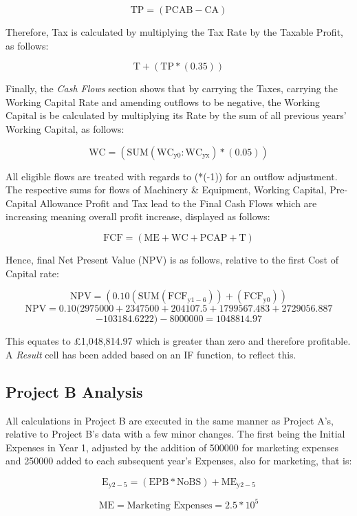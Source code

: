 \documentclass[11pt, english]{article}
\begin{document}
	$$\mathrm{TP=(PCAB-CA)}$$

	Therefore, Tax is calculated by multiplying the Tax Rate by the Taxable Profit, as follows:

	$$\mathrm{T+(TP*(0.35))}$$

	Finally, the \textit{Cash Flows} section shows that by carrying the Taxes, carrying the Working Capital Rate and amending outflows to be negative, the Working Capital is be calculated by multiplying its Rate by the sum of all previous years’ Working Capital, as follows:

	$$\mathrm{WC=(SUM(WC_{y0}:WC_{yx})*(0.05))}$$

	All eligible flows are treated with regards to (*(-1)) for an outflow adjustment. The respective sums for flows of Machinery \& Equipment, Working Capital, Pre-Capital Allowance Profit and Tax lead to the Final Cash Flows which are increasing meaning overall profit increase, displayed as follows:

	$$\mathrm{FCF=(ME+WC+PCAP+T)}$$

	Hence, final Net Present Value (NPV) is as follows, relative to the first Cost of Capital rate:

	$$\mathrm{NPV=(0.10(SUM(FCF_{y1-6}))+(FCF_{y0}))}$$ $$\mathrm{NPV=0.10(2975000+2347500+204107.5+1799567.483+2729056.887}$$ $$\mathrm{-103184.6222)-8000000=1048814.97}$$

	This equates to \pounds1,048,814.97 which is greater than zero and therefore profitable. A \textit{Result} cell has been added based on an IF function, to reflect this.

	\subsection{Project B Analysis}

	All calculations in Project B are executed in the same manner as Project A’s, relative to Project B’s data with a few minor changes. The first being the Initial Expenses in Year 1, adjusted by the addition of 500000 for marketing expenses and 250000 added to each subsequent year’s Expenses, also for marketing, that is:

	$$\mathrm{E_{y2-5}=(EPB*NoBS)+ME_{y2-5}}$$

	$$\mathrm{ME=\textrm{Marketing Expenses}=2.5*10^5}$$
\end{document}
